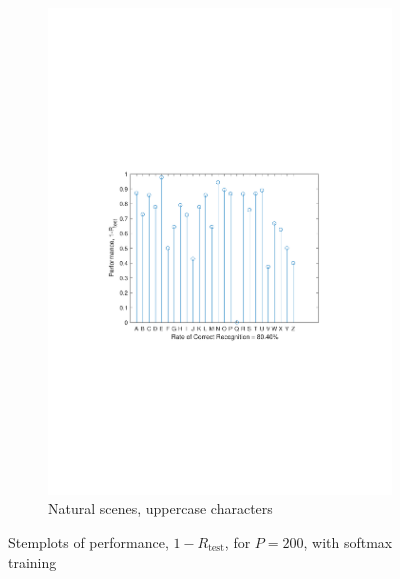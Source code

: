 \documentclass[journal,a4paper,onecolumn,11pt]{IEEEtran}
\begin{document}
\begin{figure}[!h]
\begin{subfigure}{.5\textwidth}
		\includegraphics[clip, trim=0cm .25cm 0cm .4cm, width=\textwidth]{performance_uppercasechar_sm.pdf}
		\caption{Natural scenes, uppercase characters}
		\label{fig:performance_uppercasechar_sm}
	\end{subfigure}
	\caption{Stemplots of performance, $1-R_{\text{test}}$, for $P=200$, with softmax training}
	\label{fig:datasets_performance_sm}
\end{figure}

\pagebreak
\end{document}
